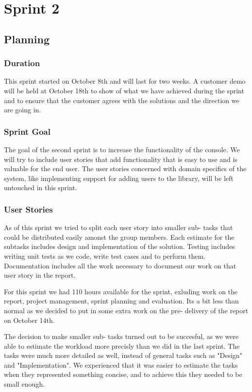 \chapter{Sprint 2}
\section{Planning}

\subsection{Duration}
This sprint started on October 8th and will last for two weeks. A customer demo will be held at October 18th to show of what we have achieved during the sprint and to ensure that the customer agrees with the solutions and the direction we are going in.

\subsection{Sprint Goal}
The goal of the second sprint is to increase the functionality of the console. We will try to include user stories that add functionality that is easy to use and is valuable for the end user. The user stories concerned with domain specifics of the system, like implementing support for adding users to the library, will be left untouched in this sprint.

\subsection{User Stories}
As of this sprint we tried to split each user story into smaller sub- tasks that could be distributed easily amonst the group members. Each estimate for the subtasks includes design and implementation of the solution. Testing includes writing unit tests as we code, write test cases and to perform them. Documentation includes all the work necessary to document our work on that user story in the report.

For this sprint we had 110 hours available for the sprint, exluding work on the report, project management, sprint planning and evaluation. Its a bit less than normal as we decided to put in some extra work on the pre- delivery of the report on October 14th.
\newline

The decision to make smaller sub- tasks turned out to be succesful, as we were able to estimate the workload more precisly than we did in the last sprint. The tasks were much more detailed as well, instead of general tasks such as "Design" and "Implementation". We experienced that it was easier to estimate the tasks when they represented something concise, and to achieve this they needed to be small enough.

